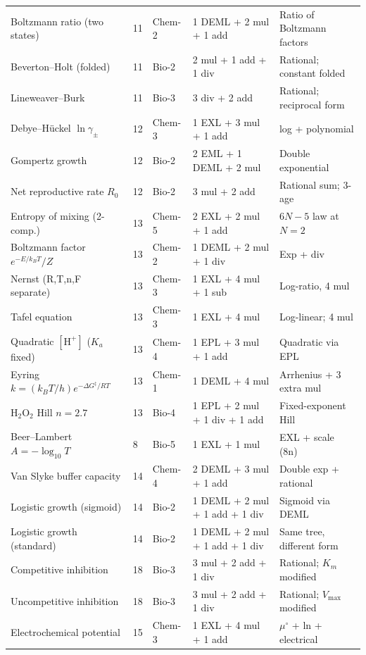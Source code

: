 \documentclass[12pt,a4paper]{article}
\theoremstyle{definition}
\begin{document}
\begin{center}
\begin{longtable}{L{5.2cm} C{1.0cm} C{1.5cm} L{4.8cm} L{2.8cm}}
Boltzmann ratio (two states) & 11 & Chem-2 & 1 DEML + 2 mul + 1 add & Ratio of Boltzmann factors \\
Beverton--Holt (folded) & 11 & Bio-2 & 2 mul + 1 add + 1 div & Rational; constant folded \\
Lineweaver--Burk & 11 & Bio-3 & 3 div + 2 add & Rational; reciprocal form \\
Debye--H\"{u}ckel $\ln\gamma_\pm$ & 12 & Chem-3 & 1 EXL + 3 mul + 1 add & log + polynomial \\
Gompertz growth & 12 & Bio-2 & 2 EML + 1 DEML + 2 mul & Double exponential \\
Net reproductive rate $R_0$ & 12 & Bio-2 & 3 mul + 2 add & Rational sum; 3-age \\
Entropy of mixing (2-comp.) & 13 & Chem-5 & 2 EXL + 2 mul + 1 add & $6N-5$ law at $N=2$ \\
Boltzmann factor $e^{-E/k_BT}/Z$ & 13 & Chem-2 & 1 DEML + 2 mul + 1 div & Exp + div \\
Nernst (R,T,n,F separate) & 13 & Chem-3 & 1 EXL + 4 mul + 1 sub & Log-ratio, 4 mul \\
Tafel equation & 13 & Chem-3 & 1 EXL + 4 mul & Log-linear; 4 mul \\
Quadratic $[\mathrm{H}^+]$ ($K_a$ fixed) & 13 & Chem-4 & 1 EPL + 3 mul + 1 add & Quadratic via EPL \\
Eyring $k=(k_BT/h)e^{-\Delta G^\ddagger/RT}$ & 13 & Chem-1 & 1 DEML + 4 mul & Arrhenius + 3 extra mul \\
$\mathrm{H}_2\mathrm{O}_2$ Hill $n=2.7$ & 13 & Bio-4 & 1 EPL + 2 mul + 1 div + 1 add & Fixed-exponent Hill \\
Beer--Lambert $A=-\log_{10}T$ & 8 & Bio-5 & 1 EXL + 1 mul & EXL + scale (8n) \\
Van Slyke buffer capacity & 14 & Chem-4 & 2 DEML + 3 mul + 1 add & Double exp + rational \\
Logistic growth (sigmoid) & 14 & Bio-2 & 1 DEML + 2 mul + 1 add + 1 div & Sigmoid via DEML \\
Logistic growth (standard) & 14 & Bio-2 & 1 DEML + 2 mul + 1 add + 1 div & Same tree, different form \\
Competitive inhibition & 18 & Bio-3 & 3 mul + 2 add + 1 div & Rational; $K_m$ modified \\
Uncompetitive inhibition & 18 & Bio-3 & 3 mul + 2 add + 1 div & Rational; $V_\mathrm{max}$ modified \\
Electrochemical potential & 15 & Chem-3 & 1 EXL + 4 mul + 1 add & $\mu^\circ$ + ln + electrical \\

\end{longtable}
\end{center}
\end{document}
